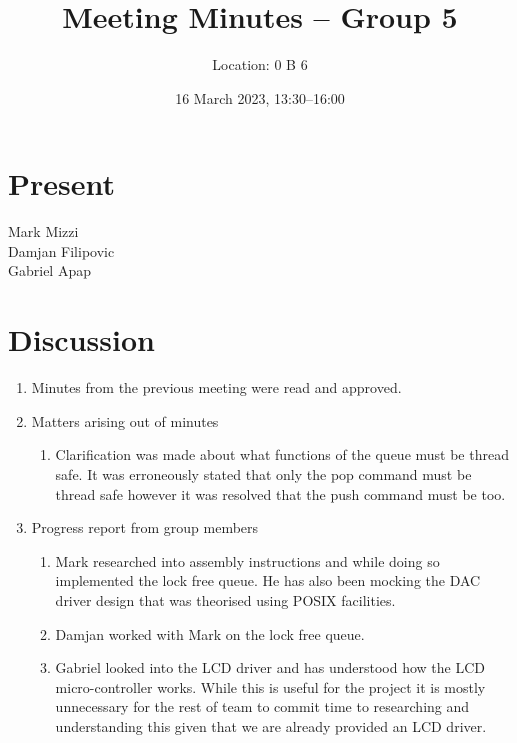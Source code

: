 \documentclass[11pt,a4paper]{scrartcl}
\title{Meeting Minutes -- Group 5}
\author{Location: 0 B 6}
\date{16 March 2023, 13:30--16:00}
\begin{document}
\maketitle

\section*{Present}
Mark Mizzi\\
Damjan Filipovic\\
Gabriel Apap

\section*{Discussion}

\begin{enumerate}


\item Minutes from the previous meeting were read and approved.

\item Matters arising out of minutes
   \begin{enumerate}
        \item Clarification was made about what functions of the queue must be thread safe. It was erroneously stated that only the pop command must be thread safe however it was resolved that the push command must be too.
   \end{enumerate}

\item Progress report from group members
   \begin{enumerate}
        \item Mark researched into assembly instructions and while doing so implemented the lock free queue. He has also been mocking the DAC driver design that was theorised using POSIX facilities.
        \item Damjan worked with Mark on the lock free queue.
        \item Gabriel looked into the LCD driver and has understood how the LCD micro-controller works. While this is useful for the project it is mostly unnecessary for the rest of team to commit time to researching and understanding this given that we are already provided an LCD driver.
   \end{enumerate}


\end{enumerate}
\end{document}
